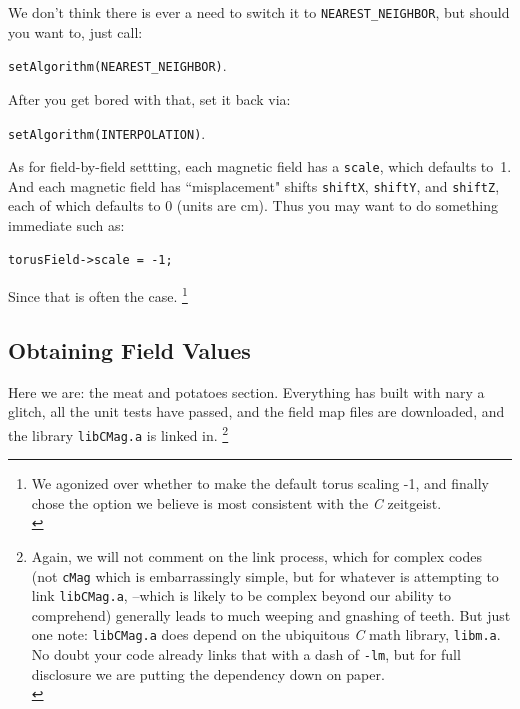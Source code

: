 \documentclass{article}
\begin{document}
We don't think there is ever a need to switch it to \texttt{NEAREST\_NEIGHBOR}, but should you want to, just call:

\texttt{setAlgorithm(NEAREST\_NEIGHBOR)}. 

After you get bored with that, set it back via: 

\texttt{setAlgorithm(INTERPOLATION)}.

As for field-by-field  settting, each magnetic field has a \texttt{scale}, which defaults to\ 1. And each magnetic field has ``misplacement" shifts \texttt{shiftX}, \texttt{shiftY}, and \texttt{shiftZ}, each of which defaults to 0 (units are cm). Thus you may want to do something immediate such as:
 \begin{verbatim} 
torusField->scale = -1;
\end{verbatim}
Since that is often the case. \footnote{We agonized over whether to make the default torus scaling -1, and finally chose the option we believe is most consistent with the \textit{C} zeitgeist.\\}


\subsection{Obtaining Field Values}
Here we are: the meat and potatoes section. Everything has built with nary a glitch, all the unit tests have passed,  and the field map files are downloaded, and the library \texttt{libCMag.a} is linked in. \footnote{Again, we will not comment on the link process, which for complex codes (not \texttt{cMag} which is embarrassingly simple, but for whatever is attempting to link \texttt{libCMag.a}, --which is likely to be complex beyond our ability to comprehend) generally leads to much weeping and gnashing of teeth. But just one note: \texttt{libCMag.a} does depend on the ubiquitous \textit{C} math library, \texttt{libm.a}. No doubt your code already links that with a dash of \texttt{-lm}, but for full disclosure we are putting the dependency down on paper.\\}
\end{document}
